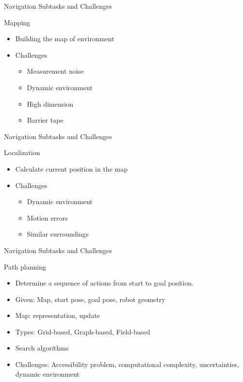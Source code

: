 \begin{frame}{Navigation Subtasks and Challenges}

\begin{block}{Mapping}
	\begin{itemize}
		\item Building the map of environment
		\item \alert {Challenges}
		\begin{itemize}
		\item Measurement noise
		\item Dynamic environment 
		\item High dimension
		\item Barrier tape
\end{itemize}		
	\end{itemize}
\end{block}
 
\end{frame}
\begin{frame}{Navigation Subtasks and Challenges}

\begin{block}{Localization}
	\begin{itemize}
		\item Calculate current position in the map
		\item \alert{ Challenges}
		\begin{itemize}
		\item Dynamic environment
		\item Motion errors
		\item Similar surroundings 
\end{itemize}		  
	\end{itemize}
\end{block}
 
\end{frame}
\begin{frame}{Navigation Subtasks and Challenges}

\begin{block}{Path planning}
    \begin{itemize}
    		\item Determine a sequence of actions from start to goal position.
    		\item Given: Map, start pose, goal pose, robot geometry
    		\item Map: representation, update
    		\item Types: Grid-based, Graph-based, Field-based
    		\item Search algorithms
    		\item \alert{Challenges: Accessibility problem, computational complexity, uncertainties, dynamic environment}
    \end{itemize}
\end{block}
\end{frame}
